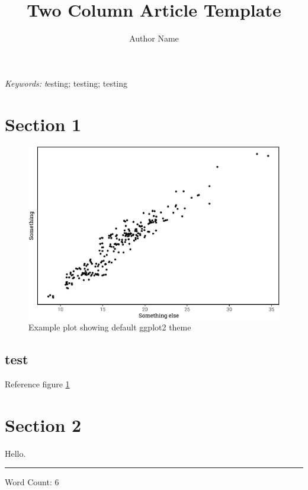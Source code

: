 \documentclass[a4paper, twocolumn, 10pt]{extarticle}
\title{Two Column Article Template}
\author{Author Name}
\makeatletter
\providecommand{\keywords}[1]{\footnotesize\textit{Keywords: }\normalfont\textit #1\selectfont}
\renewcommand\Authfont{\normalfont\sffamily\bfseries\fontsize{8}{8}\selectfont}
\newcommand{\absfont}{\sffamily\bfseries\fontsize{7}{7}\selectfont}
\newcommand{\datesfont}{\normalfont\sffamily\fontsize{6}{6}\selectfont}
\newcommand{\titlefont}{\normalfont\rmfamily\fontsize{22pt}{24pt}\selectfont}
\renewcommand{\maketitle}{\bgroup\setlength{\parindent}{0pt}
\begin{flushleft}
    \baselineskip=24pt \titlefont{\@title\par}
    \vskip 10pt
    \Authfont{\@author}
    \vskip 8pt
    \datesfont{This version was compiled on \@date}
    \vskip 8pt
\end{flushleft}\egroup
}
\makeatother
\begin{document}
\twocolumn[
    \maketitle

\author{Author Name}

\date{29 October, 2019}
]
{\setstretch{1.5}\absfont{\lipsum[1-1]}\par}
\keywords{testing; testing; testing}
\vskip 20pt

\hypertarget{section-1}{%
\section{Section 1}\label{section-1}}

\lipsum[1-2]

\begin{figure}[H]

{\centering \includegraphics[width=.75\linewidth]{skeleton_files/figure-latex/plot-1} 

}

\caption{Example plot showing default ggplot2 theme}\label{fig:plot}
\end{figure}

\hypertarget{test}{%
\subsection{test}\label{test}}

Reference figure \ref{fig:plot}

\lipsum[1-2]

\hypertarget{section-2}{%
\section{Section 2}\label{section-2}}

\lipsum[1-50]

Hello.

\nocite{tidyverse,devtools,Hmisc,PerformanceAnalytics,ggthemes,RStoolbox,broom,viridis,viridisLite,ggpubr,magrittr,sf,kableExtra,scales,lidR,raster,nvimcom,varhandle,future,rgdal,pbapply,cowplot,bibtex,benchmarkme,parallel,showtext,data.table,wesanderson}
\noindent

\rule{2cm}{0.4pt}

Word Count: 6


{\footnotesize}

\cleardoublepage
\end{document}
